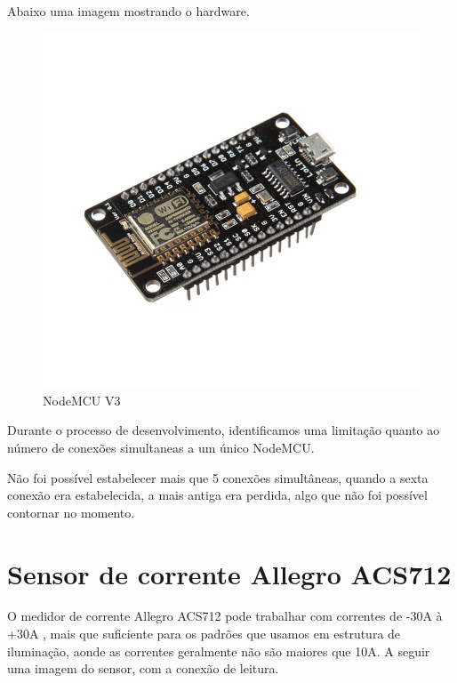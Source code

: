 \documentclass[openright]{normas-utf-tex} %
\begin{document}
Abaixo uma imagem mostrando o hardware.

\begin{figure}[h!b]
\centering 
\includegraphics[scale=0.5]{nodemcu.jpg}
\caption{NodeMCU V3}
\label{NodeMCU}
\end{figure}

Durante o processo de desenvolvimento, identificamos uma limitação quanto ao número de conexões simultaneas a um único NodeMCU. 

Não foi possível estabelecer mais que 5 conexões simultâneas, quando a sexta conexão era estabelecida, a mais antiga era perdida, algo que não foi possível contornar no momento.

\section{Sensor de corrente Allegro ACS712}
O medidor de corrente Allegro ACS712  \cite{Allegro} pode trabalhar com correntes de -30A à +30A   \cite{Allegro} , mais que suficiente para os padrões que usamos em estrutura de iluminação, aonde as correntes geralmente não são maiores que 10A. A seguir uma imagem do sensor, com a conexão de leitura.
\end{document}
